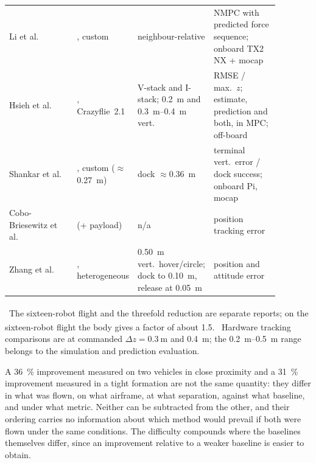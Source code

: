 \begin{table}[t]
\begin{tabular}{@{}>{\raggedright\arraybackslash}p{0.26\linewidth}>{\raggedright\arraybackslash}p{0.15\linewidth}>{\raggedright\arraybackslash}p{0.22\linewidth}>{\raggedright\arraybackslash}p{0.25\linewidth}@{}}
    Li et al.~\cite{li2023ndpnmpc}               & 2, custom          & neighbour-relative & NMPC with predicted force sequence; onboard TX2 NX + mocap \\
    Hsieh et al.~\cite{hsieh2025onlineadaptation} & 3, Crazyflie~2.1 & V-stack and I-stack; \SI{0.2}{\metre} and \SIrange{0.3}{0.4}{\metre} vert. & RMSE / max.\ $z$; estimate, prediction and both, in MPC; off-board \\
    Shankar et al.~\cite{shankar2023docking}    & 2, custom (\(\approx\)\SI{0.27}{\metre}) & dock \(\approx\)\SI{0.36}{\metre} & terminal vert.\ error / dock success; onboard Pi, mocap \\
    Cobo-Briesewitz et al.~\cite{cobobriesewitz2026lindi} & 1 (+ payload) & n/a                 & position tracking error \\
    Zhang et al.~\cite{zhang2024proxfly}        & 2, heterogeneous   & \SI{0.50}{\metre} vert.\ hover/circle; dock to \SI{0.10}{\metre}, release at \SI{0.05}{\metre} & position and attitude error \\
    \bottomrule
  \end{tabular}

  \vspace{0.4em}
  \begin{minipage}{\linewidth}\footnotesize
    \textsuperscript{\dag}~The sixteen-robot flight and the threefold reduction are separate
    reports; on the sixteen-robot flight the body gives a factor of about \num{1.5}.
    \textsuperscript{\ddag}~Hardware tracking comparisons are at commanded
    \(\Delta z = \SI{0.3}{\metre}\) and \SI{0.4}{\metre}; the \SIrange{0.2}{0.5}{\metre} range
    belongs to the simulation and prediction evaluation.
  \end{minipage}
\end{table}

A \SI{36}{\percent} improvement measured on two vehicles in close proximity and a
\SI{31}{\percent} improvement measured in a tight formation are not the same quantity: they differ
in what was flown, on what airframe, at what separation, against what baseline, and under what
metric. Neither can be subtracted from the other, and their ordering carries no information about
which method would prevail if both were flown under the same conditions. The difficulty compounds
where the baselines themselves differ, since an improvement relative to a weaker baseline is
easier to obtain.

